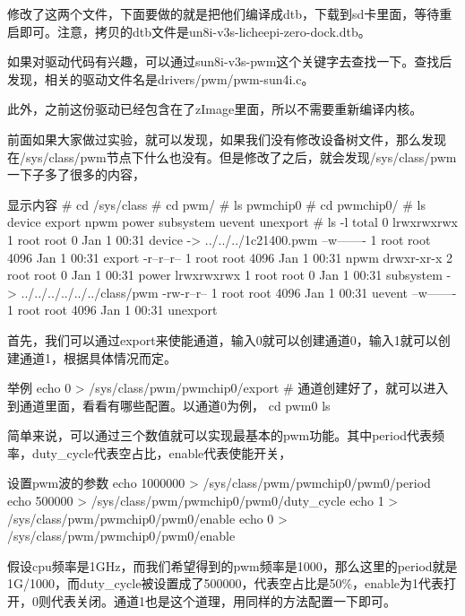 \documentclass[lang=cn,newtx,10pt,scheme=chinese]{elegantbook}
\begin{document}
修改了这两个文件，下面要做的就是把他们编译成dtb，下载到sd卡里面，等待重启即可。注意，拷贝的dtb文件是un8i-v3s-licheepi-zero-dock.dtb。

如果对驱动代码有兴趣，可以通过sun8i-v3s-pwm这个关键字去查找一下。查找后发现，相关的驱动文件名是drivers/pwm/pwm-sun4i.c。

此外，之前这份驱动已经包含在了zImage里面，所以不需要重新编译内核。

前面如果大家做过实验，就可以发现，如果我们没有修改设备树文件，那么发现在/sys/class/pwm节点下什么也没有。但是修改了之后，就会发现/sys/class/pwm一下子多了很多的内容，

\begin{mycode}{显示内容}
# cd /sys/class
# cd pwm/
# ls
pwmchip0
# cd pwmchip0/
# ls
device     export     npwm       power      subsystem  uevent     unexport
# ls -l
total 0
lrwxrwxrwx    1 root     root             0 Jan  1 00:31 device -> ../../../1c21400.pwm
--w-------    1 root     root          4096 Jan  1 00:31 export
-r--r--r--    1 root     root          4096 Jan  1 00:31 npwm
drwxr-xr-x    2 root     root             0 Jan  1 00:31 power
lrwxrwxrwx    1 root     root             0 Jan  1 00:31 subsystem -> ../../../../../../class/pwm
-rw-r--r--    1 root     root          4096 Jan  1 00:31 uevent
--w-------    1 root     root          4096 Jan  1 00:31 unexport
\end{mycode}

首先，我们可以通过export来使能通道，输入0就可以创建通道0，输入1就可以创建通道1，根据具体情况而定。

\begin{mycode}{举例}
echo 0 > /sys/class/pwm/pwmchip0/export
# 通道创建好了，就可以进入到通道里面，看看有哪些配置。以通道0为例，
cd pwm0
ls
\end{mycode}

简单来说，可以通过三个数值就可以实现最基本的pwm功能。其中period代表频率，duty\_cycle代表空占比，enable代表使能开关，

\begin{mycode}{设置pwm波的参数}
echo 1000000 > /sys/class/pwm/pwmchip0/pwm0/period
echo 500000 > /sys/class/pwm/pwmchip0/pwm0/duty_cycle
echo 1 > /sys/class/pwm/pwmchip0/pwm0/enable
echo 0 > /sys/class/pwm/pwmchip0/pwm0/enable
\end{mycode}

假设cpu频率是1GHz，而我们希望得到的pwm频率是1000，那么这里的period就是1G/1000，而duty\_cycle被设置成了500000，代表空占比是50\%，enable为1代表打开，0则代表关闭。通道1也是这个道理，用同样的方法配置一下即可。
\end{document}
